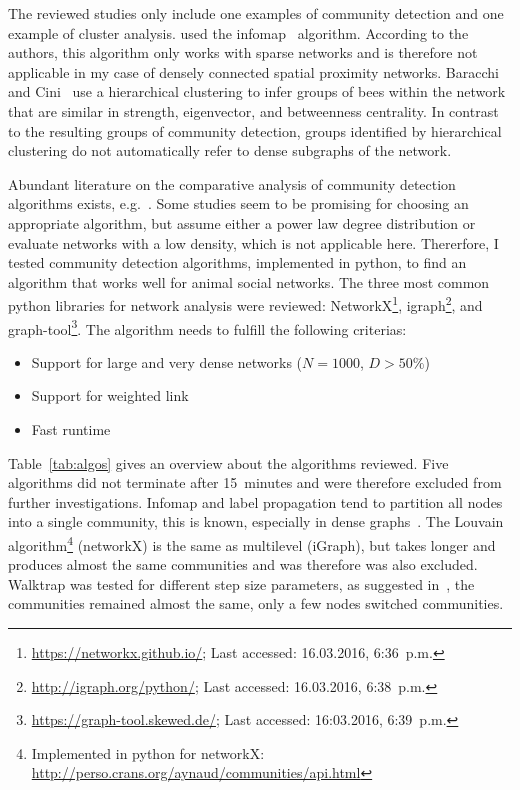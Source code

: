 The reviewed studies only include one examples of community detection and one example of cluster analysis. \textcite{mersch2013tracking} used the infomap~\cite{rosvall2009map,rosvall2007information} algorithm.
According to the authors, this algorithm only works with sparse networks and is therefore not applicable in my case of densely connected spatial proximity networks.
Baracchi and Cini~\cite{baracchi2014socio} use a hierarchical clustering to infer groups of bees within the network that are similar in strength, eigenvector, and betweenness centrality.
In contrast to the resulting groups of community detection, groups identified by hierarchical clustering do not automatically refer to dense subgraphs of the network.

Abundant literature on the comparative analysis of community detection algorithms exists, e.g.~\cite{yang2016comparative, harenberg2014community}.
Some studies seem to be promising for choosing an appropriate algorithm, but assume either a power law degree distribution or
evaluate networks with a low density, which is not applicable here.
Thererfore, I tested community detection algorithms, implemented in python, to find an algorithm that works well for animal social networks. The three most common python libraries for network analysis were reviewed: NetworkX\footnote{\url{https://networkx.github.io/}; Last accessed: 16.03.2016, 6:36~p.m.}, igraph\footnote{\url{http://igraph.org/python/}; Last accessed: 16.03.2016, 6:38~p.m.}, and graph-tool\footnote{\url{https://graph-tool.skewed.de/}; Last accessed: 16:03.2016, 6:39~p.m.}.
The algorithm needs to fulfill the following criterias:

\begin{itemize}
\item Support for large and very dense networks ($N=1000$, $D>50\%$)
\item Support for weighted link
\item Fast runtime
\end{itemize}

Table~\ref{tab:algos} gives an overview about the algorithms reviewed.
Five algorithms did not terminate after 15~minutes and were therefore excluded from further investigations.
Infomap and label propagation tend to partition all nodes into a single community, this is known, especially in dense graphs~\cite{yang2016comparative, fortunato2010community}.
The Louvain algorithm\footnote{Implemented in python for networkX: \url{http://perso.crans.org/aynaud/communities/api.html}} (networkX) is the same as multilevel (iGraph), but takes longer and produces almost the same communities and was therefore was also excluded.
Walktrap was tested for different step size parameters, as suggested in~\cite{pons2005computing}, the communities remained almost the same, only a few nodes switched communities.


